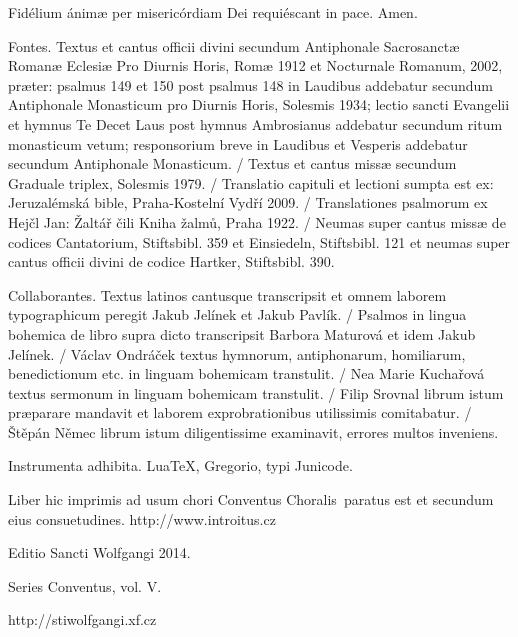 \documentclass[a4paper, twoside, 12pt]{article}
\newcommand{\annusEditionis}{2014}
\begin{document}
\vfill

\noindent \Vbardot{} Fidélium ánimæ per misericórdiam Dei requiéscant in pace.
\Rbardot{} Amen.

\vfill

\newpage
\RemoveSideThumbs
\pagestyle{empty}



\vfill

\newpage

\vspace*{4cm}

Fontes.
Textus et cantus officii divini secundum
Antiphonale Sacrosanctæ Romanæ Eclesiæ Pro Diurnis Horis, Romæ 1912
et Nocturnale Romanum, 2002, præter: psalmus 149 et 150 post
psalmus 148 in Laudibus addebatur secundum Antiphonale Monasticum pro Diurnis Horis,
Solesmis 1934; lectio sancti Evangelii et hymnus Te Decet Laus post hymnus
Ambrosianus addebatur secundum ritum monasticum vetum; responsorium breve
in Laudibus et Vesperis addebatur secundum Antiphonale Monasticum. /
Textus et cantus missæ secundum
Graduale triplex, Solesmis 1979. /
Translatio capituli et lectioni sumpta est ex:
Jeruzalémská bible, Praha-Kostelní Vydří 2009. /
Translationes psalmorum ex
Hejčl Jan: Žaltář čili Kniha žalmů, Praha 1922. /
Neumas super cantus missæ de codices Cantatorium, Stiftsbibl. 359 et Einsiedeln,
Stiftsbibl. 121 et neumas super cantus officii divini de codice Hartker,
Stiftsbibl. 390.

Collaborantes.
Textus latinos cantusque transcripsit et omnem laborem typographicum peregit
Jakub Jelínek et Jakub Pavlík. /
Psalmos in lingua bohemica de libro supra dicto transcripsit
Barbora Maturová et idem Jakub Jelínek. /
Václav Ondráček textus hymnorum, antiphonarum, homiliarum, benedictionum etc.
in linguam bohemicam transtulit. /
Nea Marie Kuchařová textus sermonum in linguam bohemicam transtulit. /
Filip Srovnal librum istum præparare mandavit et laborem exprobrationibus
utilissimis comitabatur. /
Štěpán Němec librum istum diligentissime examinavit, errores multos
inveniens.

Instrumenta adhibita.
LuaTeX, %
Gregorio, %
typi Junicode. %

\begin{center}
Liber hic imprimis ad usum chori
\guillemotright Conventus Choralis\guillemotleft\
paratus est
et secundum eius consuetudines.
http://www.introitus.cz

\vspace{1cm}

{\large Editio Sancti Wolfgangi \annusEditionis.}

\vspace{2mm}

Series \guillemotright Conventus\guillemotleft, vol. V.

\vspace{1cm}

http://stiwolfgangi.xf.cz

\end{center}

\vfill
\end{document}
